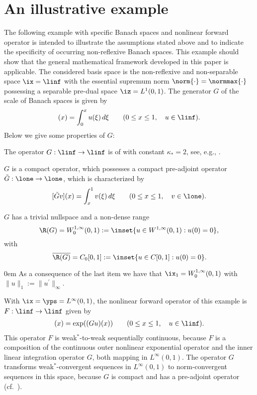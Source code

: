 \documentclass[10pt]{article}
\theoremstyle{definition}
\begin{document}
\section{An illustrative example}
\label{sec:example}
%
The following example with specific Banach spaces and nonlinear forward operator is intended to illustrate the assumptions stated above and to indicate the specificity of occurring non-reflexive Banach spaces.
This example should show that the general mathematical framework developed in this paper is applicable. The considered basis space is the non-reflexive and non-separable space $ \ix = \linf $
with the essential supremum norm $ \norm{\cdot} = \normmax{\cdot} $ possessing a separable pre-dual space $\iz=L^1(0,1)$. The generator $G$  of the scale of Banach spaces is given by
%
\begin{align}
[Gu](x) = \int_0^x u(\xi) \, d\xi \qquad (0 \le x \le 1, \quad u \in \linf).
\label{eq:exopG}
\end{align}
%
Below we give some properties of $ G $:
\begin{mylist_indent}
\item
The operator $ G: \linf \to \linf $ is of \postype
with constant $ \kappa_* = 2 $,
see, e.g., \cite{Plato95}.

\item
$G$ is a compact operator, which possesses a compact pre-adjoint operator $ \tilde G: \lone \to \lone $, which is characterized by $$ [\tilde Gv](x) = \int_x^1 v(\xi) \, d\xi \qquad (0 \le x \le 1, \quad v \in \lone).$$


\item $G$ has a trivial nullspace and a non-dense range
$$ \R(G) = W^{1,\infty}_0(0,1) :=  \inset{ u \in W^{1,\infty}(0,1) : u(0) = 0 }, $$
with $$ \overline{\R(G)} =
C_0[0,1] := \inset{u \in C[0,1]:u(0) = 0 }.$$

\end{mylist_indent}

{\parindent0em As} a consequence of the last item we have that $\ix_1=W^{1,\infty}_0(0,1)$ with $\|u\|_1:=\|u^\prime\|_\infty$.
%


With $\ix=\yps=L^\infty(0,1)$, the nonlinear forward operator of this example is
$ F: \linf \to \linf $ given by
%
\begin{align}
[F(u)](x) = \exp((Gu)(x)) \qquad (0 \le x\le 1,\quad u \in \linf).
\label{eq:exopF}
\end{align}
%
This operator $F$ is weak$^*$-to-weak sequentially continuous, because $F$ is a composition
of the continuous outer nonlinear exponential operator and the inner linear integration operator $G$, both mapping in $L^\infty(0,1)$. The operator $G$ transforms weak$^*$-convergent sequences in  $L^\infty(0,1)$ to norm-convergent sequences in this space, because $G$ is compact and has a pre-adjoint operator (cf.~\cite[Lemma~2.5]{Gatica18}).
\end{document}
